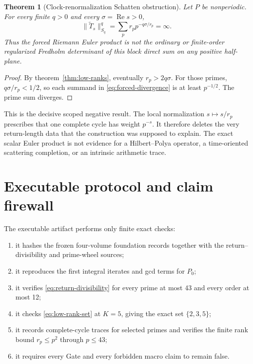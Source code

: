 \documentclass[11pt]{article}
\newtheorem{theorem}{Theorem}[section]
\theoremstyle{remark}
\newcommand{\RePart}{\operatorname{Re}}
\begin{document}
\begin{theorem}[Clock-renormalization Schatten obstruction]
\label{thm:forced-zeta}
Let \(P\) be nonperiodic.  For every finite \(q>0\) and every
\(\sigma=\RePart s>0\),
\[
 \|\widetilde T_s\|_{S_q}^q
 =\sum_p r_p p^{-q\sigma/r_p}=\infty.
 \label{eq:forced-divergence}
\]
Thus the forced Riemann Euler product is not the ordinary or finite-order
regularized Fredholm determinant of this block direct sum on any positive
half-plane.
\end{theorem}

\begin{proof}
By theorem~\ref{thm:low-ranks}, eventually \(r_p>2q\sigma\).  For those
primes, \(q\sigma/r_p<1/2\), so each summand in
\eqref{eq:forced-divergence} is at least \(p^{-1/2}\).  The prime sum
diverges.
\end{proof}

This is the decisive scoped negative result.  The local normalization
\(s\mapsto s/r_p\) prescribes that one complete cycle has weight \(p^{-s}\).
It therefore deletes the very return-length data that the construction was
supposed to explain.  The exact scalar Euler product is not evidence for a
Hilbert--Polya operator, a time-oriented scattering completion, or an
intrinsic arithmetic trace.

\section{Executable protocol and claim firewall}

The executable artifact performs only finite exact checks:

\begin{enumerate}
\item it hashes the frozen four-volume foundation records together with the
return--divisibility and prime-wheel sources;
\item it reproduces the first integral iterates and gcd terms for \(P_0\);
\item it verifies \eqref{eq:return-divisibility} for every prime at most 43
and every order at most 12;
\item it checks \eqref{eq:low-rank-set} at \(K=5\), giving the exact set
\(\{2,3,5\}\);
\item it records complete-cycle traces for selected primes and verifies the
finite rank bound \(r_p\le p^2\) through \(p\le43\);
\item it requires every Gate and every forbidden macro claim to remain false.
\end{enumerate}
\end{document}
